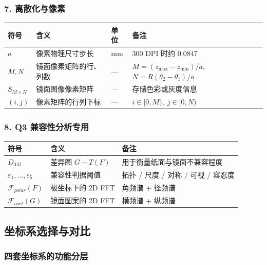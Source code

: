 \documentclass[12pt, a4paper]{ctexart}
\begin{document}
\subsubsection*{7. 离散化与像素}
\begin{table}[H]
\centering
\begin{tabular}{lllp{6cm}}
\toprule
\textbf{符号} & \textbf{含义} & \textbf{单位} & \textbf{备注} \\
\midrule
$a$ & 像素物理尺寸步长 & mm & 300 DPI 时约 $0.0847$ \\
$M, N$ & 镜面像素矩阵的行、列数 & — & $M = (z_{\max}-z_{\min})/a,$ \newline $N = R(\theta_2-\theta_1)/a$ \\
$S_{M \times N}$ & 镜面图像像素矩阵 & — & 存储色彩或灰度信息 \\
$(i, j)$ & 像素矩阵的行列下标 & — & $i \in [0, M),\; j \in [0, N)$ \\
\bottomrule
\end{tabular}
\end{table}

\subsubsection*{8. Q3 兼容性分析专用}
\begin{table}[H]
\centering
\begin{tabular}{lll}
\toprule
\textbf{符号} & \textbf{含义} & \textbf{备注} \\
\midrule
$D_{\text{diff}}$ & 差异图 $G - T(F)$ & 用于衡量纸面与镜面不兼容程度 \\
$\varepsilon_1, \dots, \varepsilon_5$ & 兼容性判据阈值 & 拓扑 / 尺度 / 对称 / 可视 / 容忍度 \\
$\mathcal{F}_{polar}(F)$ & 极坐标下的 2D FFT & 角频谱 + 径频谱 \\
$\mathcal{F}_{cart}(G)$ & 镜面图案的 2D FFT & 横频谱 + 纵频谱 \\
\bottomrule
\end{tabular}
\end{table}

\subsection{坐标系选择与对比}

\subsubsection{四套坐标系的功能分层}
\end{document}
